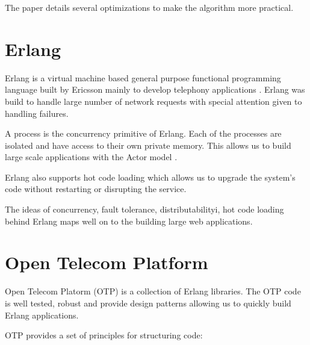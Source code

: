 The paper details several optimizations to make the algorithm more practical.

\section{Erlang}

Erlang \citep{erlang} is a virtual machine based general purpose functional 
programming language built by Ericsson mainly to develop telephony applications 
\citep{Armstrong07}. Erlang was build to handle large number of network
requests with special attention given to handling failures.

A process is the concurrency primitive of Erlang. Each of the processes are 
isolated and have access to their own private memory. This allows us to build
large scale applications with the Actor model%
\citep{Clinger81}.

Erlang also supports hot code loading which allows us to upgrade the system's
code without restarting or disrupting the service.

The ideas of concurrency, fault tolerance, distributabilityi, hot code loading
behind Erlang maps well on to the building large web applications.



\section{Open Telecom Platform}
\label{section:concepts.otp}

Open Telecom Platorm (OTP) is a collection of Erlang libraries. The OTP code is
well tested, robust and provide design patterns allowing us to quickly build 
Erlang applications.

OTP provides a set of principles for structuring code:

